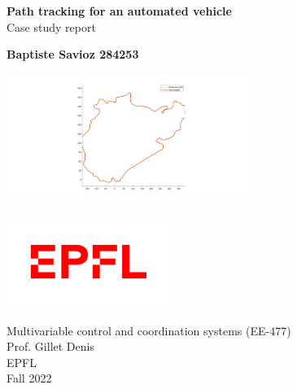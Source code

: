 \begin{titlepage}
    \begin{center}

        \Huge
        \textbf{Path tracking for an automated vehicle}\\
        \vspace{0.3cm}
        Case study report
        \vspace{0.5cm}
        \LARGE
        
            
        \vspace{1.5cm}

        \textbf{Baptiste Savioz 284253}\\

        \vfill

        \includegraphics[width=0.6\textwidth]{Latex report/image/ex2/trajectory.png}
            
        \vspace{0.8cm}
        
        \includegraphics[width=0.4\textwidth]{Latex report/image/epfl.png}
        
        \Large
        Multivariable control and coordination systems (EE-477)\\
        Prof. Gillet Denis\\
        EPFL\\
        Fall 2022
            
    \end{center}
\end{titlepage}